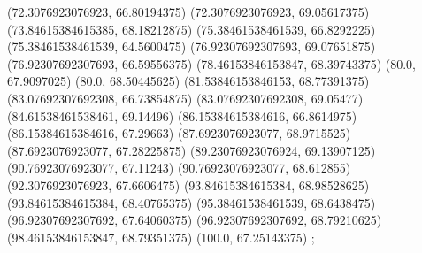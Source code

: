 {{{		(72.3076923076923, 66.80194375)
		(72.3076923076923, 69.05617375)
		(73.84615384615385, 68.18212875)
		(75.38461538461539, 66.8292225)
		(75.38461538461539, 64.5600475)
		(76.92307692307693, 69.07651875)
		(76.92307692307693, 66.59556375)
		(78.46153846153847, 68.39743375)
		(80.0, 67.9097025)
		(80.0, 68.50445625)
		(81.53846153846153, 68.77391375)
		(83.07692307692308, 66.73854875)
		(83.07692307692308, 69.05477)
		(84.61538461538461, 69.14496)
		(86.15384615384616, 66.8614975)
		(86.15384615384616, 67.29663)
		(87.6923076923077, 68.9715525)
		(87.6923076923077, 67.28225875)
		(89.23076923076924, 69.13907125)
		(90.76923076923077, 67.11243)
		(90.76923076923077, 68.612855)
		(92.3076923076923, 67.6606475)
		(93.84615384615384, 68.98528625)
		(93.84615384615384, 68.40765375)
		(95.38461538461539, 68.6438475)
		(96.92307692307692, 67.64060375)
		(96.92307692307692, 68.79210625)
		(98.46153846153847, 68.79351375)
		(100.0, 67.25143375)
	};

}}
